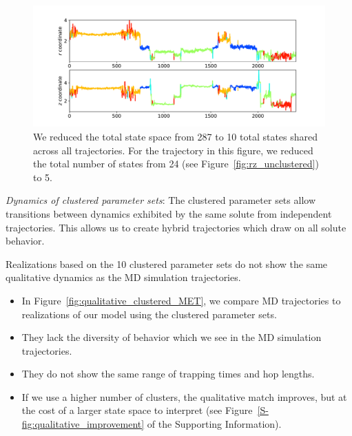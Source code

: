 \documentclass[journal=jpcbfk,manuscript=article]{achemso}
\begin{document}
  \begin{figure}
  \centering
  \includegraphics[width=\textwidth]{clustered_traj_MET_ward_10.pdf}
  \caption{We reduced the total state space from 287 to 10 total states 
  shared across all trajectories. For the trajectory in this figure, we reduced
  the total number of states from 24 (see Figure~\ref{fig:rz_unclustered}) to
  5.}\label{fig:clustered_traj_MET}
  \end{figure}
  
  \textit{Dynamics of clustered parameter sets}: The clustered parameter sets
  allow transitions between dynamics exhibited by the same solute from independent 
  trajectories. This allows us to create hybrid trajectories which draw on all
  solute behavior.
  
  Realizations based on the 10 clustered parameter sets do not show the same
  qualitative dynamics as the MD simulation trajectories. 
  \begin{itemize}  
    \item In Figure~\ref{fig:qualitative_clustered_MET}, we compare MD 
    trajectories to realizations of our model using the clustered parameter sets.
    \item They lack the diversity of behavior which we see in the MD simulation trajectories.
    \item They do not show the same range of trapping times and hop lengths.
    \item If we use a higher number of clusters, the qualitative match improves, but
    at the cost of a larger state space to interpret (see Figure~\ref{S-fig:qualitative_improvement}
    of the Supporting Information).
  \end{itemize}
  
\end{document}
